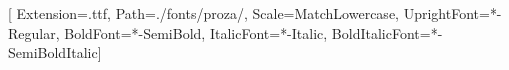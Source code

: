 
\usepackage{comment}
\usepackage{tkz-euclide}
\usepackage[hidelinks]{hyperref}

\usepackage{auxhook} %


\usepackage{amsmath}
\usepackage{amsthm}
\usepackage{thmtools}
\usepackage{fontspec}


\usepackage{newpxtext,newpxmath}

\setsansfont{ProzaLibre}[
  Extension={.ttf},
  Path=./fonts/proza/,
  Scale=MatchLowercase,
  UprightFont={*-Regular},
  BoldFont={*-SemiBold},
  ItalicFont={*-Italic},
  BoldItalicFont={*-SemiBoldItalic}]

\RequirePackage{etoolbox}






\usepackage{lastpage} %
\renewcommand\pagemark{\hfill{\usekomafont{pagenumber}\thepage\ / \pageref{LastPage}}}




